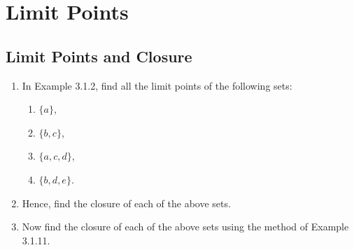 \chapter{Limit Points}

\section{Limit Points and Closure}

\begin{exercise}
    \begin{enumerate}[label={(\alph*)}]
        \item In Example 3.1.2, find all the limit points of the following sets:
              \begin{enumerate}[label={(\roman*)}]
                  \item $\{a\}$,
                  \item $\{b,c\}$,
                  \item $\{a,c,d\}$,
                  \item $\{b,d,e\}$.
              \end{enumerate}
        \item Hence, find the closure of each of the above sets.
        \item Now find the closure of each of the above sets using the method of Example 3.1.11.
    \end{enumerate}
\end{exercise}

